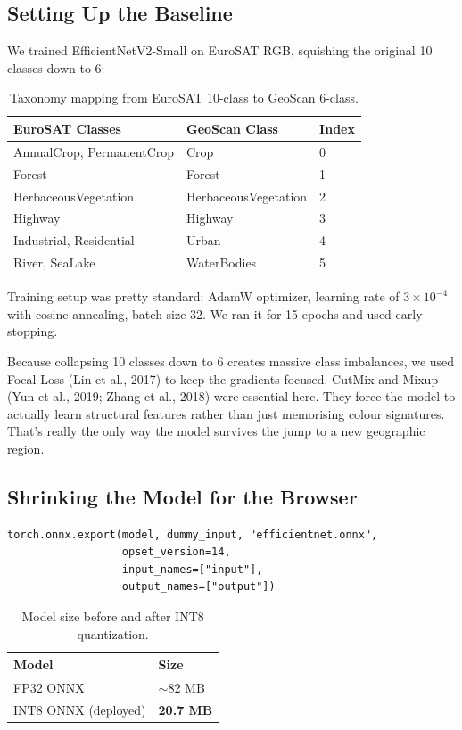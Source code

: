 \documentclass[journal]{IEEEtran}
\begin{document}
\subsection{Setting Up the Baseline}

We trained EfficientNetV2-Small on EuroSAT RGB, squishing the original
10 classes down to 6:

\begin{longtable}[]{@{}lll@{}}
\caption{Taxonomy mapping from EuroSAT 10-class to GeoScan 6-class.}\\
\toprule\noalign{}
EuroSAT Classes & GeoScan Class & Index \\
\midrule\noalign{}
\endhead
\bottomrule\noalign{}
\endlastfoot
AnnualCrop, PermanentCrop & Crop & 0 \\
Forest & Forest & 1 \\
HerbaceousVegetation & HerbaceousVegetation & 2 \\
Highway & Highway & 3 \\
Industrial, Residential & Urban & 4 \\
River, SeaLake & WaterBodies & 5 \\
\end{longtable}

Training setup was pretty standard: AdamW optimizer, learning rate of
$3 \times 10^{-4}$ with cosine annealing, batch size 32. We ran it for
15 epochs and used early stopping.

Because collapsing 10 classes down to 6 creates massive class
imbalances, we used Focal Loss (Lin et al., 2017) to keep the gradients
focused. CutMix and Mixup (Yun et al., 2019; Zhang et al., 2018) were
essential here. They force the model to actually learn structural
features rather than just memorising colour signatures. That's really
the only way the model survives the jump to a new geographic region.

\subsection{Shrinking the Model for the Browser}

\begin{verbatim}
torch.onnx.export(model, dummy_input, "efficientnet.onnx", 
                  opset_version=14, 
                  input_names=["input"], 
                  output_names=["output"])
\end{verbatim}

\begin{longtable}[]{@{}ll@{}}
\caption{Model size before and after INT8 quantization.}\\
\toprule\noalign{}
Model & Size \\
\midrule\noalign{}
\endhead
\bottomrule\noalign{}
\endlastfoot
FP32 ONNX & $\sim$82 MB \\
INT8 ONNX (deployed) & \textbf{20.7 MB} \\
\end{longtable}
\end{document}
